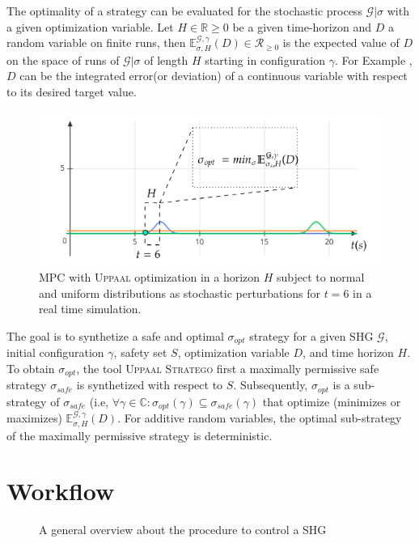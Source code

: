     The optimality of a strategy can be evaluated for the stochastic 
    process $\mathcal{G}|\sigma$ with a given optimization variable.
    Let $H \in \mathbb{R} \geqslant 0$ be a given time-horizon and $D$
    a random variable on finite runs, then $\mathbb{E}^{\mathcal{G},
    \gamma}_{\sigma,H}(D) \in \mathcal{R}_{\geqslant 0}$ is the 
    expected value of $D$ on the space of runs of $\mathcal{G|\sigma}$
    of length $H$ starting in configuration $\gamma$. For Example
    , $D$ can be the integrated error(or deviation) of a continuous 
    variable with respect to its desired target value.

    \clearpage

    \begin{figure}[!hbt]
      \centering
      \includegraphics[width=0.7\linewidth]{images/realtime}      
      \caption{\ac{MPC} with \textsc{Uppaal} optimization in a 
      horizon $H$ subject to normal and uniform distributions as stochastic perturbations for $t=6$ in a real time simulation.}
      \label{fig:realtime}
    \end{figure}
    
    The goal is to synthetize a safe and optimal $\sigma_{opt}$ 
    strategy for a given \ac{SHG} $\mathcal{G}$, initial configuration
    $\gamma$, safety set $S$, optimization variable $D$, and time 
    horizon $H$. To obtain 
    $\sigma_{opt}$, the tool \textsc{Uppaal Stratego} first a 
    maximally permissive safe strategy $\sigma_{safe}$ is synthetized
    with respect to $S$. Subsequently, $\sigma_{opt}$ is a sub-strategy
    of $\sigma_{safe}$ (i.e, $\forall \gamma \in \mathbb{C}: 
    \sigma_{opt}(\gamma) \subseteq \sigma_{safe}(\gamma)$ that 
    optimize (minimizes or maximizes) $\mathbb{E}^{\mathcal{G},
    \gamma}_{\sigma,H}(D)$. For additive random variables, the 
    optimal sub-strategy of the maximally permissive strategy is 
    deterministic.
    
  \section{Workflow}
  \label{sec:workflow}
    \begin{figure}[!hbt]
      \centering
      
      \captionsetup{format=hang}
      \caption{A general overview about the procedure to control a \ac{SHG}}
      \label{fig:perturbationsgeneration}
    \end{figure}





